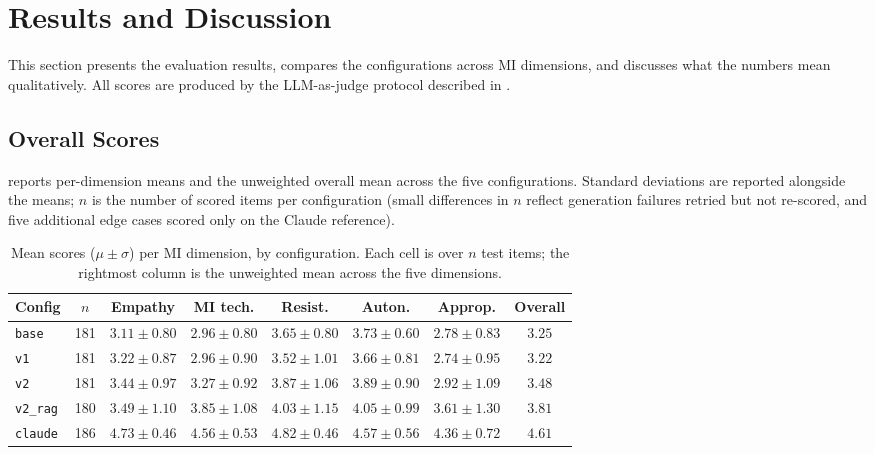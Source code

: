 \section{Results and Discussion}
\label{sec:results}

This section presents the evaluation results, compares the configurations
across MI dimensions, and discusses what the numbers mean qualitatively.
All scores are produced by the LLM-as-judge protocol described in
.

\subsection{Overall Scores}

 reports per-dimension means and the unweighted overall
mean across the five configurations. Standard deviations are reported alongside
the means; $n$ is the number of scored items per configuration (small
differences in $n$ reflect generation failures retried but not re-scored, and
five additional edge cases scored only on the Claude reference).

\begin{table}[h]
\centering
\caption{Mean scores ($\mu \pm \sigma$) per MI dimension, by configuration.
Each cell is over $n$ test items; the rightmost column is the unweighted mean
across the five dimensions.}
\label{tab:results-main}
\small
\setlength{\tabcolsep}{4pt}
\begin{tabular}{l c c c c c c c}
\toprule
\textbf{Config} & $n$ & \textbf{Empathy} & \textbf{MI tech.} & \textbf{Resist.} & \textbf{Auton.} & \textbf{Approp.} & \textbf{Overall} \\
\midrule
\texttt{base}    & 181 & $3.11 \pm 0.80$ & $2.96 \pm 0.80$ & $3.65 \pm 0.80$ & $3.73 \pm 0.60$ & $2.78 \pm 0.83$ & $3.25$ \\
\texttt{v1}      & 181 & $3.22 \pm 0.87$ & $2.96 \pm 0.90$ & $3.52 \pm 1.01$ & $3.66 \pm 0.81$ & $2.74 \pm 0.95$ & $3.22$ \\
\texttt{v2}      & 181 & $3.44 \pm 0.97$ & $3.27 \pm 0.92$ & $3.87 \pm 1.06$ & $3.89 \pm 0.90$ & $2.92 \pm 1.09$ & $3.48$ \\
\texttt{v2\_rag} & 180 & $3.49 \pm 1.10$ & $3.85 \pm 1.08$ & $4.03 \pm 1.15$ & $4.05 \pm 0.99$ & $3.61 \pm 1.30$ & $\mathbf{3.81}$ \\
\texttt{claude}  & 186 & $4.73 \pm 0.46$ & $4.56 \pm 0.53$ & $4.82 \pm 0.46$ & $4.57 \pm 0.56$ & $4.36 \pm 0.72$ & $\mathbf{4.61}$ \\
\bottomrule
\end{tabular}
\end{table}

